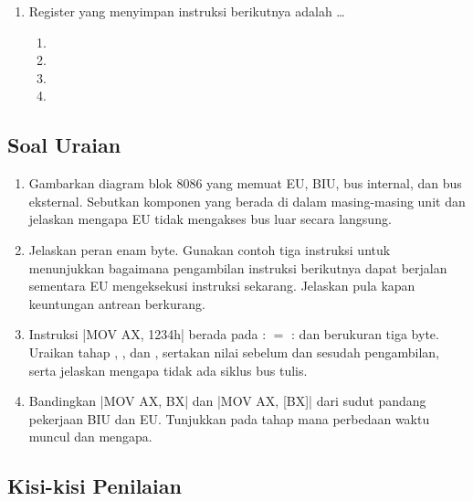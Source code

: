 \begin{enumerate}
    \item Register yang menyimpan  instruksi berikutnya
          adalah \dots
          \begin{enumerate}
              \item {} \item {}
              \item {} \item {}
          \end{enumerate}
\end{enumerate}

\subsection{Soal Uraian}

\begin{enumerate}
    \item Gambarkan diagram blok 8086 yang memuat EU, BIU, bus
          internal, dan bus eksternal. Sebutkan komponen yang berada
          di dalam masing-masing unit dan jelaskan mengapa EU tidak
          mengakses bus luar secara langsung.

    \item Jelaskan peran  enam byte. Gunakan
          contoh tiga instruksi untuk menunjukkan bagaimana
          pengambilan instruksi berikutnya dapat berjalan sementara
          EU mengeksekusi instruksi sekarang. Jelaskan pula kapan
          keuntungan antrean berkurang.

    \item Instruksi \lstasm|MOV AX, 1234h| berada pada
          : $=$ : dan berukuran
          tiga byte. Uraikan tahap , , dan
          , sertakan nilai  sebelum dan sesudah
          pengambilan, serta jelaskan mengapa tidak ada siklus bus
          tulis.

    \item Bandingkan \lstasm|MOV AX, BX| dan \lstasm|MOV AX, [BX]|
          dari sudut pandang pekerjaan BIU dan EU. Tunjukkan pada
          tahap mana perbedaan waktu muncul dan mengapa.
\end{enumerate}

\subsection{Kisi-kisi Penilaian}

